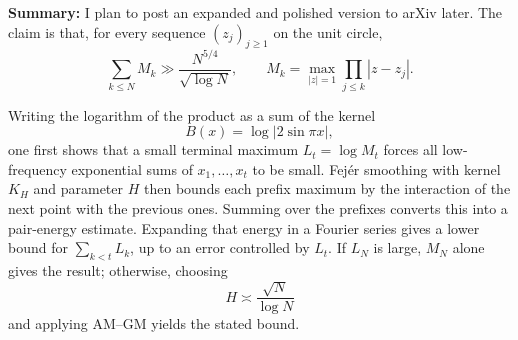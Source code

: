 \documentclass[11pt]{article}
\begin{document}
\onehalfspacing

\textbf{Summary:}
I plan to post an expanded and polished version to arXiv later. The claim is
that, for every sequence $(z_j)_{j\geq 1}$ on the unit circle,
\[
  \sum_{k\leq N} M_k
  \gg
  \frac{N^{5/4}}{\sqrt{\log N}},
  \qquad
  M_k
  =
  \max_{|z|=1}\prod_{j\leq k}|z-z_j|.
\]

Writing the logarithm of the product as a sum of the kernel
\[
  B(x)=\log|2\sin \pi x|,
\]
one first shows that a small terminal maximum $L_t=\log M_t$ forces all
low-frequency exponential sums of $x_1,\dots,x_t$ to be small. Fej\'er
smoothing with kernel $K_H$ and parameter $H$ then bounds each prefix maximum
by the interaction of the next point with the previous ones. Summing over the
prefixes converts this into a pair-energy estimate. Expanding that energy in a
Fourier series gives a lower bound for $\sum_{k<t}L_k$, up to an error
controlled by $L_t$. If $L_N$ is large, $M_N$ alone gives the result;
otherwise, choosing
\[
  H\asymp \frac{\sqrt{N}}{\log N}
\]
and applying AM--GM yields the stated bound.
\end{document}
